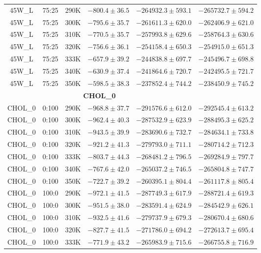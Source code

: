 \begin{longtable}{|c|c|c|c|c|c|}
45W\_L & 75:25 & 290K & $-800.4 \pm 36.5$ & $-264932.3 \pm 593.1$ & $-265732.7 \pm 594.2$ \\
45W\_L & 75:25 & 300K & $-795.6 \pm 35.7$ & $-261611.3 \pm 620.0$ & $-262406.9 \pm 621.0$ \\
45W\_L & 75:25 & 310K & $-770.5 \pm 35.7$ & $-257993.8 \pm 629.6$ & $-258764.3 \pm 630.6$ \\
45W\_L & 75:25 & 320K & $-756.6 \pm 36.1$ & $-254158.4 \pm 650.3$ & $-254915.0 \pm 651.3$ \\
45W\_L & 75:25 & 333K & $-657.9 \pm 39.2$ & $-244838.8 \pm 697.7$ & $-245496.7 \pm 698.8$ \\
45W\_L & 75:25 & 340K & $-630.9 \pm 37.4$ & $-241864.6 \pm 720.7$ & $-242495.5 \pm 721.7$ \\
45W\_L & 75:25 & 350K & $-598.5 \pm 38.3$ & $-237852.4 \pm 744.2$ & $-238450.9 \pm 745.2$ \\
\midrule \multicolumn{5}{c}{\textbf{CHOL\_0}} \\ \midrule
CHOL\_0 & 0:100 & 290K & $-968.8 \pm 37.7$ & $-291576.6 \pm 612.0$ & $-292545.4 \pm 613.2$ \\
CHOL\_0 & 0:100 & 300K & $-962.4 \pm 40.3$ & $-287532.9 \pm 623.9$ & $-288495.3 \pm 625.2$ \\
CHOL\_0 & 0:100 & 310K & $-943.5 \pm 39.9$ & $-283690.6 \pm 732.7$ & $-284634.1 \pm 733.8$ \\
CHOL\_0 & 0:100 & 320K & $-921.2 \pm 41.3$ & $-279793.0 \pm 711.1$ & $-280714.2 \pm 712.3$ \\
CHOL\_0 & 0:100 & 333K & $-803.7 \pm 44.3$ & $-268481.2 \pm 796.5$ & $-269284.9 \pm 797.7$ \\
CHOL\_0 & 0:100 & 340K & $-767.6 \pm 42.0$ & $-265037.2 \pm 746.5$ & $-265804.8 \pm 747.7$ \\
CHOL\_0 & 0:100 & 350K & $-722.7 \pm 39.2$ & $-260395.1 \pm 804.4$ & $-261117.8 \pm 805.4$ \\
CHOL\_0 & 100:0 & 290K & $-972.1 \pm 41.5$ & $-287749.3 \pm 617.9$ & $-288721.4 \pm 619.3$ \\
CHOL\_0 & 100:0 & 300K & $-951.5 \pm 38.0$ & $-283591.4 \pm 624.9$ & $-284542.9 \pm 626.1$ \\
CHOL\_0 & 100:0 & 310K & $-932.5 \pm 41.6$ & $-279737.9 \pm 679.3$ & $-280670.4 \pm 680.6$ \\
CHOL\_0 & 100:0 & 320K & $-827.7 \pm 41.5$ & $-271786.0 \pm 694.2$ & $-272613.7 \pm 695.4$ \\
CHOL\_0 & 100:0 & 333K & $-771.9 \pm 43.2$ & $-265983.9 \pm 715.6$ & $-266755.8 \pm 716.9$ \\

\end{longtable}
